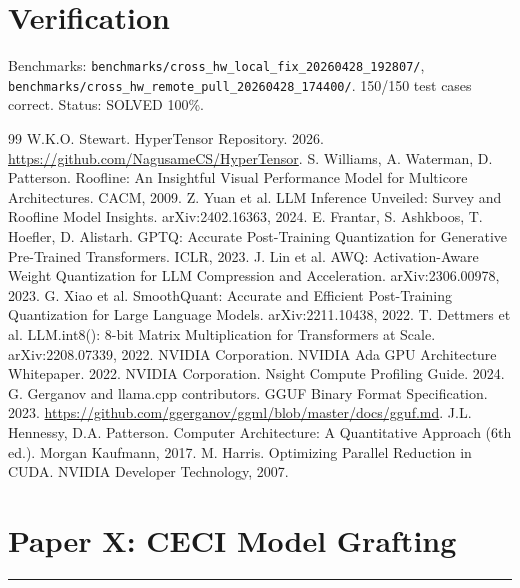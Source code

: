 \documentclass[11pt]{article}
\begin{document}
\section{Verification}

Benchmarks: \texttt{benchmarks/cross\_hw\_local\_fix\_20260428\_192807/},
\texttt{benchmarks/cross\_hw\_remote\_pull\_20260428\_174400/}.
150/150 test cases correct. Status: SOLVED 100\%.

\clearpage
\begin{thebibliography}{99}
 W.K.O. Stewart. HyperTensor Repository. 2026. \url{https://github.com/NagusameCS/HyperTensor}.
 S. Williams, A. Waterman, D. Patterson. Roofline: An Insightful Visual Performance Model for Multicore Architectures. CACM, 2009.
 Z. Yuan et al. LLM Inference Unveiled: Survey and Roofline Model Insights. arXiv:2402.16363, 2024.
 E. Frantar, S. Ashkboos, T. Hoefler, D. Alistarh. GPTQ: Accurate Post-Training Quantization for Generative Pre-Trained Transformers. ICLR, 2023.
 J. Lin et al. AWQ: Activation-Aware Weight Quantization for LLM Compression and Acceleration. arXiv:2306.00978, 2023.
 G. Xiao et al. SmoothQuant: Accurate and Efficient Post-Training Quantization for Large Language Models. arXiv:2211.10438, 2022.
 T. Dettmers et al. LLM.int8(): 8-bit Matrix Multiplication for Transformers at Scale. arXiv:2208.07339, 2022.
 NVIDIA Corporation. NVIDIA Ada GPU Architecture Whitepaper. 2022.
 NVIDIA Corporation. Nsight Compute Profiling Guide. 2024.
 G. Gerganov and llama.cpp contributors. GGUF Binary Format Specification. 2023. \url{https://github.com/ggerganov/ggml/blob/master/docs/gguf.md}.
 J.L. Hennessy, D.A. Patterson. Computer Architecture: A Quantitative Approach (6th ed.). Morgan Kaufmann, 2017.
 M. Harris. Optimizing Parallel Reduction in CUDA. NVIDIA Developer Technology, 2007.
\end{thebibliography}

\newpage



\newpage
\section{Paper X: CECI Model Grafting}
\vspace{6pt}
\hrule
\vspace{12pt}
\end{document}
